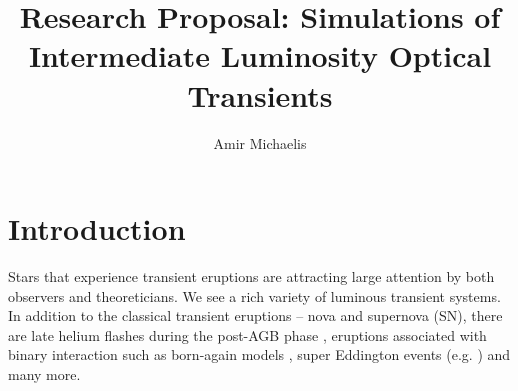 \documentclass[a4paper,modern]{aastex62}
\begin{document}
\title{\LARGE{\textbf{Research Proposal: Simulations of Intermediate Luminosity Optical Transients}}} 


\author[0000-0002-1361-9115]{Amir Michaelis}








\section{Introduction}
Stars that experience transient eruptions are attracting large attention by both observers and theoreticians.
We see a rich variety of luminous transient systems.
In addition to the classical transient eruptions -- nova and supernova (SN), there are late helium flashes during the post-AGB phase \citep{2005MNRAS.361..695L}, eruptions associated with binary interaction such as born-again models \citep{1984ApJ...277..333I,2001ApJ...554L..71H,2003ApJ...583..913L}, super Eddington events (e.g. \citealt{2009ApJ...697L..49S,2013ApJ...764L...6S,2016MNRAS.462..217S}) and many more.
\end{document}
